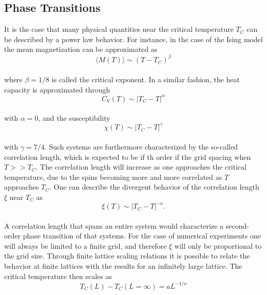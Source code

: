 \documentclass[%
reprint,nofootinbib,
amsmath,amssymb,
aps,
]{revtex4-1}
\begin{document}
\subsection*{Phase Transitions} \noindent 
It is the case that many physical quantities near the critical temperature $T_C$ can be described by a power law behavior. For instance, in the case of the Ising model the mean magnetization can be approximated as \\ 
\begin{equation}
\langle M(T) \rangle \sim \left(T-T_C\right)^{\beta}
\end{equation} \\ 
where $\beta=1/8$ is called the critical exponent. In a similar fashion, the heat capacity is approximated through \\ 
\begin{equation}
C_V(T) \sim \left|T_C-T\right|^{\alpha}
\end{equation} \\ 
with $\alpha = 0$, and the susceptibility \\
\begin{equation}
\chi(T) \sim \left|T_C-T\right|^{\gamma}
\end{equation} \\
with $\gamma = 7/4$. Such systems are furthermore characterized by the so-called correlation length, which is expected to be if th order if the grid spacing when  $T>> T_C$. The correlation length will increase as one approaches the critical temperature, due to the spins becoming more and more correlated as $T$ approaches $T_C$. One can describe the divergent behavior of the correlation length $\xi$ near $T_C$ as \\ 
\begin{equation}
\xi(T) \sim \left|T_C-T\right|^{-\nu}.
\label{eq:xi}
\end{equation}  \\ 
A correlation length that spans an entire system would characterize a second-order phase transition of that systems. For the case of numerical experiments one will always be limited to a finite grid, and therefore $\xi$ will only be proportional to the grid size. Through finite lattice scaling relations it is possible to relate the behavior at finite lattices with the results for an infinitely large lattice. The critical temperature then scales as \\
\begin{equation}
T_C(L)-T_C(L=\infty) = aL^{-1/\nu}
\label{eq:tc}
\end{equation}\\ 
\end{document}
